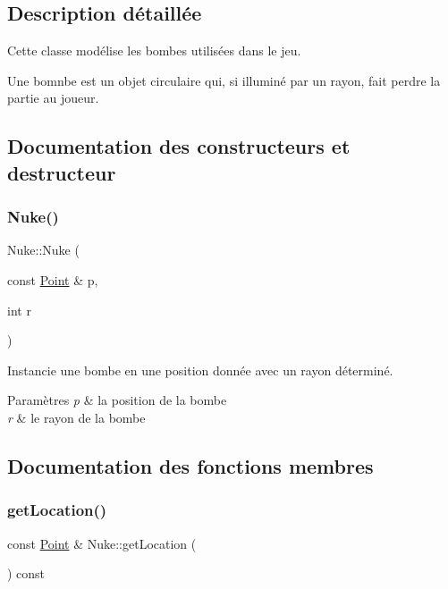 \subsection{Description détaillée}
Cette classe modélise les bombes utilisées dans le jeu. 

Une bomnbe est un objet circulaire qui, si illuminé par un rayon, fait perdre la partie au joueur. 

\subsection{Documentation des constructeurs et destructeur}
\mbox{\label{class_nuke_aa45d3d8dc6e8a71a48f76a8d9fba046f}} 
\subsubsection{\texorpdfstring{Nuke()}{Nuke()}}
{\footnotesize\ttfamily Nuke\+::\+Nuke (\begin{DoxyParamCaption}\item[{const \mbox{\hyperlink{class_point}{Point}} \&}]{p,  }\item[{int}]{r }\end{DoxyParamCaption})}

Instancie une bombe en une position donnée avec un rayon déterminé. 
\begin{DoxyParams}{Paramètres}
{\em p} & la position de la bombe \\
\hline
{\em r} & le rayon de la bombe \\
\hline
\end{DoxyParams}


\subsection{Documentation des fonctions membres}
\mbox{\label{class_nuke_a5f32834b745ecf0b58197928af2053f6}} 
\subsubsection{\texorpdfstring{getLocation()}{getLocation()}}
{\footnotesize\ttfamily const \mbox{\hyperlink{class_point}{Point}} \& Nuke\+::get\+Location (\begin{DoxyParamCaption}{ }\end{DoxyParamCaption}) const}

